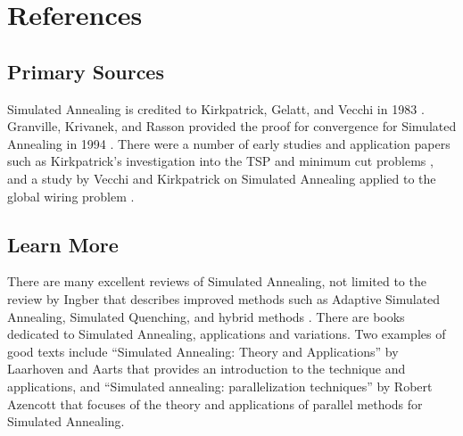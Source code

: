 \documentclass[a4paper, 11pt]{article}
\begin{document}



\section{References}
\label{sec:references}

% 
% 
\subsection{Primary Sources}
Simulated Annealing is credited to Kirkpatrick, Gelatt, and Vecchi in 1983 \cite{Kirkpatrick1983}. Granville, Krivanek, and Rasson provided the proof for convergence for Simulated Annealing in 1994 \cite{Granville1994}.
There were a number of early studies and application papers such as Kirkpatrick's investigation into the TSP and minimum cut problems \cite{Kirkpatrick1983a}, and a study by Vecchi and Kirkpatrick on Simulated Annealing applied to the global wiring problem \cite{Vecchi1983}.

% 
% 
\subsection{Learn More}
There are many excellent reviews of Simulated Annealing, not limited to the review by Ingber that describes improved methods such as Adaptive Simulated Annealing, Simulated Quenching, and hybrid methods \cite{Ingber1993}.
There are books dedicated to Simulated Annealing, applications and variations. Two examples of good texts include ``Simulated Annealing: Theory and Applications'' by Laarhoven and Aarts \cite{Laarhoven1988} that provides an introduction to the technique and applications, and ``Simulated annealing: parallelization techniques'' by Robert Azencott \cite{Azencott1992} that focuses of the theory and applications of parallel methods for Simulated Annealing.
\end{document}
